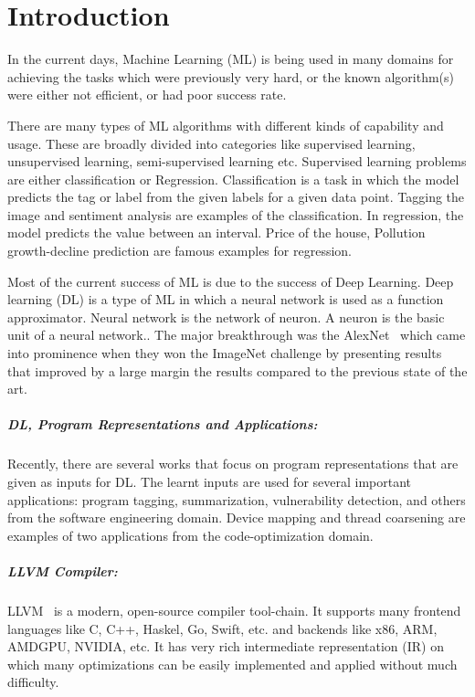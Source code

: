 \chapter{Introduction}
\label{chap:intro}


In the current days, Machine Learning (ML) is being used in many domains for achieving the tasks which were previously very hard, or the known algorithm(s) were either not efficient, or had poor success rate. 


There are many types of ML algorithms with different kinds of capability and usage. 
These are broadly divided into categories like supervised learning, unsupervised learning, semi-supervised learning etc. Supervised learning problems are either classification or Regression. Classification is a task in which the model predicts the tag or label from the given labels for a given data point. Tagging the image and sentiment analysis are examples of the classification. 
In regression, the model predicts the value between an interval. Price of the house, Pollution growth-decline prediction are famous examples for regression.

	
Most of the current success of ML is due to the success of Deep Learning. Deep learning (DL) is a type of ML in which a neural network is used as a function approximator. Neural network is the network of neuron. A neuron is the basic unit of a neural network..  The major breakthrough was the AlexNet~\cite{alexnet:NIPS_2012} which came into prominence when they won the ImageNet challenge by presenting results that improved by a large margin the results compared to the previous state of the art.
	
\paragraph{DL, Program Representations and Applications:}
Recently, there are several works that focus on program representations that are given as inputs for DL. The learnt inputs are used for several important  applications: program tagging, summarization, vulnerability detection, and others from the software engineering domain. Device mapping and thread coarsening are examples of two applications from the code-optimization domain.

\paragraph{LLVM Compiler:}
LLVM~\cite{Lattner:2004:llvm} is a modern, open-source compiler tool-chain. It supports many frontend languages like C, C++, Haskel, Go, Swift, etc. and backends like x86, ARM, AMDGPU, NVIDIA, etc. It has very rich intermediate representation (IR) on which many optimizations can be easily implemented and applied without much difficulty.
	    
